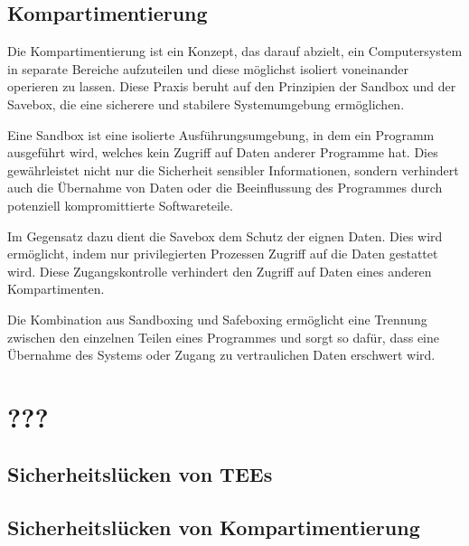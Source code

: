 \documentclass[sigconf]{acmart}
\begin{document}
\subsection{Kompartimentierung}
Die Kompartimentierung ist ein Konzept, das darauf abzielt, ein Computersystem in separate Bereiche aufzuteilen und diese möglichst isoliert voneinander operieren zu lassen. Diese Praxis beruht auf den Prinzipien der Sandbox und der Savebox, die eine sicherere und stabilere Systemumgebung ermöglichen. 

Eine Sandbox ist eine isolierte Ausführungsumgebung, in dem ein Programm ausgeführt wird, welches kein Zugriff auf Daten anderer Programme hat. Dies gewährleistet nicht nur die Sicherheit sensibler Informationen, sondern verhindert auch die Übernahme von Daten oder die Beeinflussung des Programmes durch potenziell kompromittierte Softwareteile.

Im Gegensatz dazu dient die Savebox dem Schutz der eignen Daten. Dies wird ermöglicht, indem nur privilegierten Prozessen Zugriff auf die Daten gestattet wird. Diese Zugangskontrolle verhindert den Zugriff auf Daten eines anderen Kompartimenten. 

Die Kombination aus Sandboxing und Safeboxing ermöglicht eine Trennung zwischen den einzelnen Teilen eines Programmes und sorgt so dafür, dass eine Übernahme des Systems oder Zugang zu vertraulichen Daten erschwert wird.

\section{???}

\subsection{Sicherheitslücken von TEEs}

\subsection{Sicherheitslücken von Kompartimentierung} 
\end{document}

